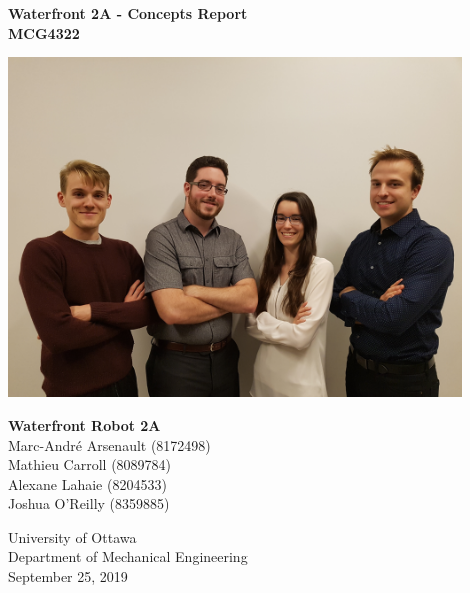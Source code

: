 
\begin{titlepage}
    \begin{center}
        \textbf{Waterfront 2A - Concepts Report}\\
        \textbf{MCG4322}
        
        \vfill
        
        \includegraphics[width=12cm]{team_picture.jpg}
        
        \vfill
        
        \textbf{Waterfront Robot 2A}\\
        Marc-André Arsenault (8172498)\\
        Mathieu Carroll (8089784)\\
        Alexane Lahaie (8204533)\\
        Joshua O'Reilly (8359885)\\
  
        \vfill
  
        University of Ottawa\\
        Department of Mechanical Engineering\\
        September 25, 2019
  
    \end{center}
 \end{titlepage}